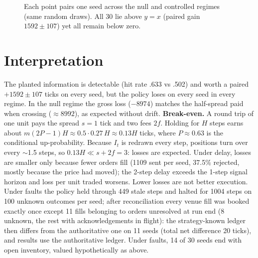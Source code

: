 \documentclass[10pt,twocolumn]{article}
\begin{document}
\begin{figure}[h]\centering
{}
\caption{Each point pairs one seed across the null and controlled regimes (same random draws). All 30 lie above
$y=x$ (paired gain $1592\pm107$) yet all remain below zero.}
\end{figure}

\section{Interpretation}
The planted information is detectable (hit rate .633 vs .502) and worth a paired $+1592\pm107$ ticks
on every seed, but the policy loses on every seed in every regime. In the null regime the gross loss
($-8974$) matches the half-spread paid when crossing ($\approx 8992$), as expected without drift.
\textbf{Break-even.} A round trip of one unit pays the spread $s=1$ tick and two fees $2f$. Holding for
$H$ steps earns about $m(2P-1)H\approx 0.5\cdot0.27\,H\approx0.13H$ ticks, where $P\approx0.63$ is
the conditional up-probability. Because $I_t$ is redrawn every step, positions turn over every
$\sim$1.5 steps, so $0.13H\ll s+2f=3$: losses are expected. Under delay, losses are smaller only
because fewer orders fill (1109 sent per seed, 37.5\% rejected, mostly because the price had moved);
the 2-step delay exceeds the 1-step signal horizon and loss per unit traded worsens. Lower losses
are not better execution. Under faults the policy held through 449 stale steps and halted for 1004
steps on 100 unknown outcomes per seed; after reconciliation every venue fill was booked exactly
once except 11 fills belonging to orders unresolved at run end (8 unknown, the rest with
acknowledgements in flight): the strategy-known ledger then differs from the authoritative one on
11 seeds (total net difference 20 ticks), and results use the authoritative ledger. Under faults, 14 of 30
seeds end with open inventory, valued hypothetically as above.
\end{document}
